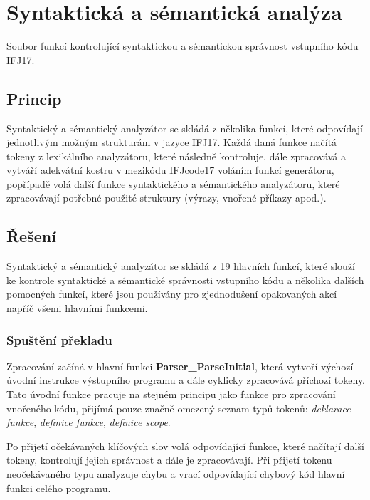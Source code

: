 \documentclass[a4paper,11pt]{article}
\begin{document}
\newpage
\section{Syntaktická a sémantická analýza} \label{syse}
Soubor funkcí kontrolující syntaktickou a sémantickou správnost vstupního kódu IFJ17.

\subsection{Princip} \label{syse-princip}
Syntaktický a sémantický analyzátor se skládá z několika funkcí, které odpovídají jednotlivým možným strukturám v jazyce IFJ17. Každá daná funkce načítá tokeny z lexikálního analyzátoru, které následně kontroluje, dále zpracovává a vytváří adekvátní kostru v mezikódu IFJcode17 voláním funkcí generátoru, popřípadě volá další funkce syntaktického a sémantického analyzátoru, které zpracovávají potřebné použité struktury (výrazy, vnořené příkazy apod.).

\subsection{Řešení} \label{syse-reseni}
Syntaktický a sémantický analyzátor se skládá z 19 hlavních funkcí, které slouží ke kontrole syntaktické a sémantické správnosti vstupního kódu a několika dalších pomocných funkcí, které jsou používány pro zjednodušení opakovaných akcí napříč všemi hlavními funkcemi.

\subsubsection{Spuštění překladu} \label{syse-reseni-uvod}
Zpracování začíná v hlavní funkci \textbf{Parser\_ParseInitial}, která vytvoří výchozí úvodní instrukce výstupního programu a dále cyklicky zpracovává příchozí tokeny. Tato úvodní funkce pracuje na stejném principu jako funkce pro zpracování vnořeného kódu, přijímá pouze značně omezený seznam typů tokenů: \textit{deklarace funkce}, \textit{definice funkce}, \textit{definice scope}. 

\vspace{2mm}
Po přijetí očekávaných klíčových slov volá odpovídající funkce, které načítají další tokeny, kontrolují jejich správnost a dále je zpracovávají. Při přijetí tokenu neočekávaného typu analyzuje chybu a vrací odpovídající chybový kód hlavní funkci celého programu.
\end{document}
